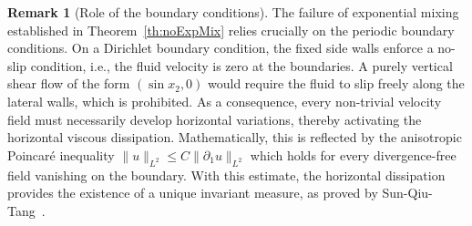 \documentclass[11pt,a4paper,reqno]{amsart}
\theoremstyle{definition}
\newtheorem{remark}[theorem]{Remark}
\begin{document}
\begin{remark}[Role of the boundary conditions]\label{rmk:boundary}
  The failure of exponential mixing established in Theorem~\ref{th:noExpMix}
  relies crucially on the periodic boundary conditions.  On a Dirichlet  boundary condition,
  the fixed side walls enforce a no-slip condition, i.e.,
   the fluid velocity is zero at the boundaries.  A purely
  vertical shear flow of the form $(\sin x_2,0)$ would require the fluid to
  slip freely along the lateral walls, which is prohibited.  As a consequence,
  every non-trivial velocity field must necessarily develop horizontal
  variations, thereby activating the horizontal viscous dissipation.
  Mathematically, this is reflected by the anisotropic Poincar\'{e} inequality
  $\|u\|_{L^2}\le C\|\partial_1 u\|_{L^2}$ which holds for every
  divergence-free field vanishing on the boundary.
  With this estimate, the horizontal dissipation provides the
  existence of a unique invariant measure, as proved by
  Sun-Qiu-Tang~\cite{SPL}.
\end{remark}

%
\end{document}
